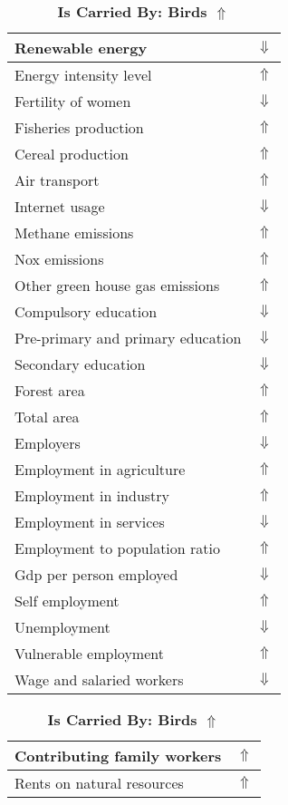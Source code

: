 \documentclass[12pt,notitlepage,oneside]{report}
\begin{document}
\clearpage
\begin{table}[!htb]
\caption{\textbf{Is Carried By: Birds $\Uparrow$}}
\centering
\label{Correlated Socio-economic Factors0}
\begin{tabular}{|l|l|}
\hline
Renewable energy & $\Downarrow$\\ \hline
Energy intensity level & $\Uparrow$\\ \hline
Fertility of women & $\Downarrow$\\ \hline
Fisheries production & $\Uparrow$\\ \hline
Cereal production & $\Uparrow$\\ \hline
Air transport  & $\Uparrow$\\ \hline
Internet usage & $\Downarrow$\\ \hline
Methane emissions & $\Uparrow$\\ \hline
Nox emissions & $\Uparrow$\\ \hline
Other green house gas emissions & $\Uparrow$\\ \hline
Compulsory education & $\Downarrow$\\ \hline
Pre-primary and primary education & $\Downarrow$\\ \hline
Secondary education & $\Downarrow$\\ \hline
Forest area & $\Uparrow$\\ \hline
Total area & $\Uparrow$\\ \hline
Employers & $\Downarrow$\\ \hline
Employment in agriculture & $\Uparrow$\\ \hline
Employment in industry & $\Uparrow$\\ \hline
Employment in services & $\Downarrow$\\ \hline
Employment to population ratio & $\Uparrow$\\ \hline
Gdp per person employed & $\Downarrow$\\ \hline
Self employment & $\Uparrow$\\ \hline
Unemployment & $\Downarrow$\\ \hline
Vulnerable employment & $\Uparrow$\\ \hline
Wage and salaried workers & $\Downarrow$\\ \hline
\end{tabular}
\begin{tabular}{|l|l|}
\hline
Contributing family workers & $\Uparrow$\\ \hline
Rents on natural resources & $\Uparrow$\\ \hline

\end{tabular}
\end{table}
\end{document}
